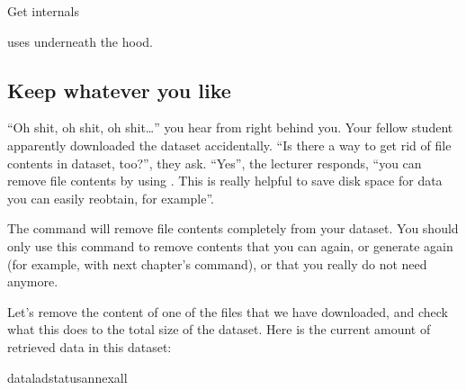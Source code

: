 \ignorespaces \begin{gitusernote}[label={index-8}, before title={\thetcbcounter\ }, check odd page=true]{Get internals}
\label{\detokenize{basics/101-105-install:index-8}}

\sphinxAtStartPar
{} uses  underneath the hood.


\end{gitusernote}

\ignorespaces 

\subsection{Keep whatever you like}
\label{\detokenize{basics/101-105-install:keep-whatever-you-like}}\label{\detokenize{basics/101-105-install:index-9}}
\sphinxAtStartPar
“Oh shit, oh shit, oh shit…” you hear from right behind you. Your fellow student
apparently downloaded the  dataset accidentally. “Is there a way to get rid
of file contents in dataset, too?”, they ask. “Yes”, the lecturer responds,
“you can remove file contents by using . This is
really helpful to save disk space for data you can easily reobtain, for example”.

\ignorespaces 
\sphinxAtStartPar
The  command will remove
file contents completely from your dataset.
You should only use this command to remove contents that you can 
again, or generate again (for example, with next chapter’s 
command), or that you really do not need anymore.

\sphinxAtStartPar
Let’s remove the content of one of the files that we have downloaded, and check
what this does to the total size of the dataset. Here is the current amount of
retrieved data in this dataset:

\begin{sphinxVerbatim}[commandchars=\\\{\}]
dataladstatus\PYGZhy{}\PYGZhy{}annexall
\end{sphinxVerbatim}

